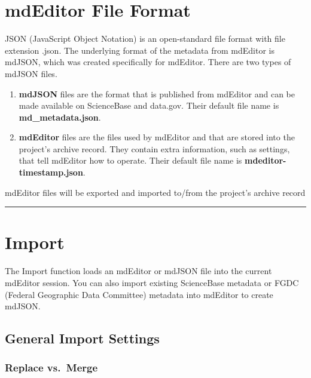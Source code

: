 \documentclass[
]{book}
\makeatletter
\providecommand{\tightlist}{%
  \setlength{\itemsep}{0pt}\setlength{\parskip}{0pt}}
\newenvironment{kframe}{%
\medskip{}
\setlength{\fboxsep}{.8em}
 \def\at@end@of@kframe{}%
 \ifinner\ifhmode%
  \def\at@end@of@kframe{\end{minipage}}%
  \begin{minipage}{\columnwidth}%
 \fi\fi%
 \def\FrameCommand##1{\hskip\@totalleftmargin \hskip-\fboxsep
 \colorbox{shadecolor}{##1}\hskip-\fboxsep
     \hskip-\linewidth \hskip-\@totalleftmargin \hskip\columnwidth}%
 \MakeFramed {\advance\hsize-\width
   \@totalleftmargin\z@ \linewidth\hsize
   \@setminipage}}%
 {\par\unskip\endMakeFramed%
 \at@end@of@kframe}
\newenvironment{rmdblock}[1]
  {
  \begin{itemize}
  \renewcommand{\labelitemi}{
    \raisebox{-.7\height}[0pt][0pt]{
      {\setkeys{Gin}{width=3em,keepaspectratio}\texttt{[image: images/\#1]}}
    }
  }
  \setlength{\fboxsep}{1em}
  \begin{kframe}
  \item
  }
  {
  \end{kframe}
  \end{itemize}
  }
\newenvironment{rmdtip}
  {\begin{rmdblock}{tip}}
  {\end{rmdblock}}
\makeatother
\begin{document}
\hypertarget{mdeditor-file-format}{%
\section{mdEditor File Format}\label{mdeditor-file-format}}

JSON (JavaScript Object Notation) is an open-standard file format with file extension .json. The underlying format of the metadata from mdEditor is mdJSON, which was created specifically for mdEditor. There are two types of mdJSON files.

\begin{enumerate}
\def\labelenumi{\arabic{enumi}.}
\tightlist
\item
  \textbf{mdJSON} files are the format that is published from mdEditor and can be made available on ScienceBase and data.gov. Their default file name is \textbf{md\_metadata.json}.
\item
  \textbf{mdEditor} files are the files used by mdEditor and that are stored into the project's archive record. They contain extra information, such as settings, that tell mdEditor how to operate. Their default file name is \textbf{mdeditor-timestamp.json}.
\end{enumerate}

\begin{rmdtip}
mdEditor files will be exported and imported to/from the project's
archive record
\end{rmdtip}

\begin{center}\rule{0.5\linewidth}{\linethickness}\end{center}

\hypertarget{import}{%
\section{Import}\label{import}}

The Import function loads an mdEditor or mdJSON file into the current mdEditor session. You can also import existing ScienceBase metadata or FGDC (Federal Geographic Data Committee) metadata into mdEditor to create mdJSON.

\hypertarget{general-import-settings}{%
\subsection{General Import Settings}\label{general-import-settings}}

\hypertarget{replace-vs.-merge}{%
\subsubsection{Replace vs.~Merge}\label{replace-vs.-merge}}
\end{document}
